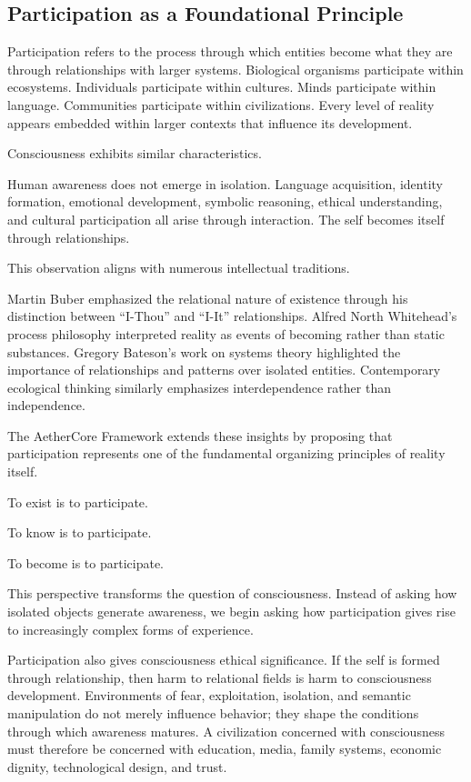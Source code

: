 \documentclass[12pt]{article}
\begin{document}
\subsection{Participation as a Foundational Principle}

Participation refers to the process through which entities become what they are through relationships with larger systems. Biological organisms participate within ecosystems. Individuals participate within cultures. Minds participate within language. Communities participate within civilizations. Every level of reality appears embedded within larger contexts that influence its development.

Consciousness exhibits similar characteristics.

Human awareness does not emerge in isolation. Language acquisition, identity formation, emotional development, symbolic reasoning, ethical understanding, and cultural participation all arise through interaction. The self becomes itself through relationships.

This observation aligns with numerous intellectual traditions.

Martin Buber emphasized the relational nature of existence through his distinction between ``I-Thou'' and ``I-It'' relationships. Alfred North Whitehead's process philosophy interpreted reality as events of becoming rather than static substances. Gregory Bateson's work on systems theory highlighted the importance of relationships and patterns over isolated entities. Contemporary ecological thinking similarly emphasizes interdependence rather than independence.

The AetherCore Framework extends these insights by proposing that participation represents one of the fundamental organizing principles of reality itself.

To exist is to participate.

To know is to participate.

To become is to participate.

This perspective transforms the question of consciousness. Instead of asking how isolated objects generate awareness, we begin asking how participation gives rise to increasingly complex forms of experience.

Participation also gives consciousness ethical significance. If the self is formed through relationship, then harm to relational fields is harm to consciousness development. Environments of fear, exploitation, isolation, and semantic manipulation do not merely influence behavior; they shape the conditions through which awareness matures. A civilization concerned with consciousness must therefore be concerned with education, media, family systems, economic dignity, technological design, and trust.
\end{document}
